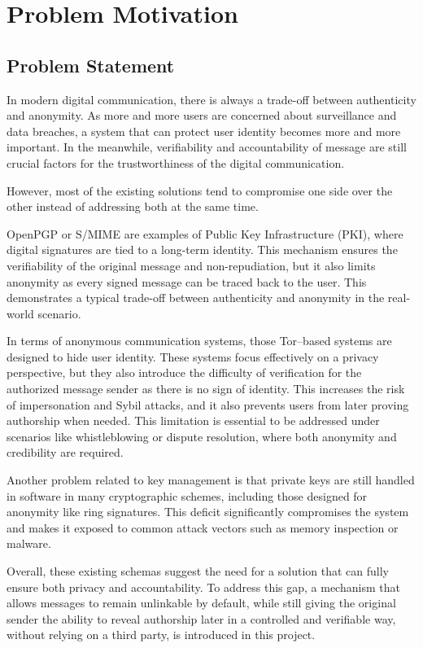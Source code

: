 \documentclass[letterpaper,11pt]{article}
\begin{document}
\newpage

\section{Problem Motivation}

\subsection{Problem Statement}
In modern digital communication, there is always a trade-off between authenticity and anonymity. As more and more users are concerned about surveillance and data breaches, a system that can protect user identity becomes more and more important. In the meanwhile, verifiability and accountability of message are still crucial factors for the trustworthiness of the digital communication.

However, most of the existing solutions tend to compromise one side over the other instead of addressing both at the same time. 

OpenPGP or S/MIME are examples of Public Key Infrastructure (PKI), where digital signatures are tied to a long-term identity. This mechanism ensures the verifiability of the original message and non-repudiation, but it also limits anonymity as every signed message can be traced back to the user. This demonstrates a typical trade-off between authenticity and anonymity in the real-world scenario.

In terms of anonymous communication systems, those Tor–based systems are designed to hide user identity. These systems focus effectively on a privacy perspective, but they also introduce the difficulty of verification for the authorized message sender as there is no sign of identity. This increases the risk of impersonation and Sybil attacks, and it also prevents users from later proving authorship when needed. This limitation is essential to be addressed under scenarios like whistleblowing or dispute resolution, where both anonymity and credibility are required.

Another problem related to key management is that private keys are still handled in software in many cryptographic schemes, including those designed for anonymity like ring signatures. This deficit significantly compromises the system and makes it exposed to common attack vectors such as memory inspection or malware.

Overall, these existing schemas suggest the need for a solution that can fully ensure both privacy and accountability. To address this gap, a mechanism that allows messages to remain unlinkable by default, while still giving the original sender the ability to reveal authorship later in a controlled and verifiable way, without relying on a third party, is introduced in this project.
\end{document}

